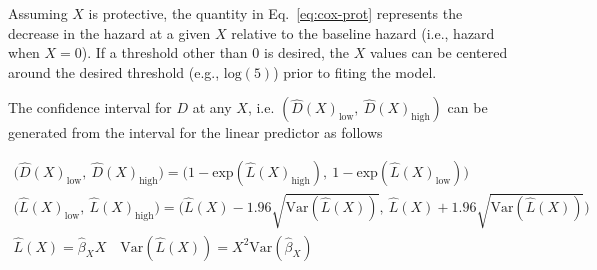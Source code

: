 Assuming $X$ is protective, the quantity in Eq.~\ref{eq:cox-prot} represents the decrease in the hazard at a given $X$ relative to the baseline hazard (i.e., hazard when $X=0$). If a threshold other than $0$ is desired, the $X$ values can be centered around the desired threshold (e.g., $\text{log}(5)$) prior to fiting the model.

The confidence interval for $D$ at any $X$, i.e. $(\hat{D}(X)_{\text{low}},~\hat{D}(X)_{\text{high}})$ can be generated from the interval for the linear predictor as follows

\begin{gather*}
    \big(\hat{D}(X)_{\text{low}},~\hat{D}(X)_{\text{high}}\big)  =
    \big(
    1 - \text{exp}(\hat{L}(X)_{\text{high}}),~
    1 - \text{exp}(\hat{L}(X)_{\text{low}})
    \big)                                                       \\
    \big(\hat{L}(X)_{\text{low}},~\hat{L}(X)_{\text{high}}\big)  =
    \big(
    \hat{L}(X) - 1.96 \sqrt{\text{Var}(\hat{L}(X))},~
    \hat{L}(X) + 1.96 \sqrt{\text{Var}(\hat{L}(X))}
    \big)                                                       \\
    \hat{L}(X) = \hat{\beta}_XX \quad
    \text{Var}(\hat{L}(X)) = X^2\text{Var}(\hat{\beta}_X)
\end{gather*}
